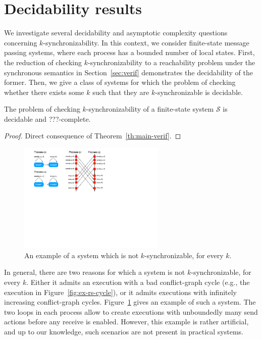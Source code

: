 \section{Decidability results}

We investigate several decidability and asymptotic complexity questions concerning $k$-synchronizability. In this context, we consider finite-state message passing systems, where each process has a bounded number of local states. First, the reduction of checking $k$-synchronizability to a reachability problem under the synchronous semantics in Section~\ref{sec:verif} demonstrates the decidability of the former. 
Then, we give a class of systems for which the problem of checking whether there exists some $k$ such that they are  $k$-synchronizable is decidable.

\begin{theorem}
The problem of checking $k$-synchronizability of a finite-state system $\mathcal{S}$ is decidable and ???-complete.
\end{theorem}
\begin{proof}
Direct consequence of Theorem~\ref{th:main-verif}.
\end{proof}

\begin{figure}
\includegraphics[width=7cm]{Ex-Decidability.pdf}
\caption{An example of a system which is not $k$-synchronizable, for every $k$.}
\label{fig:decid_ex}
\end{figure}

In general, there are two reasons for which a system is not $k$-synchronizable, for every $k$. Either it admits an execution with a bad conflict-graph cycle (e.g., the execution in Figure~\ref{fig:ex-rs-cycle}), or it admits executions with infinitely increasing conflict-graph cycles. Figure~\ref{fig:decid_ex} gives an example of such a system. 
The two loops in each process allow to create executions with unboundedly many send actions before any receive is enabled. However, this example is rather artificial, and up to our knowledge, such scenarios are not present in practical systems. 


